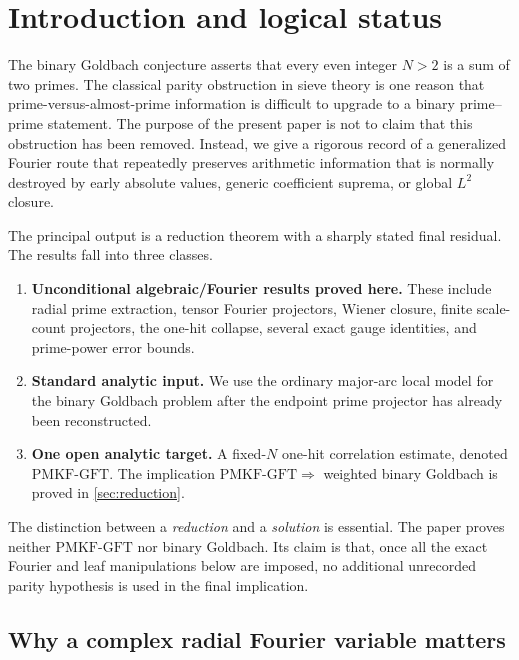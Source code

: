 \documentclass[11pt]{article}
\theoremstyle{definition}
\theoremstyle{remark}
\newcommand{\1}{\mathbf 1}
\newcommand{\PMKF}{\mathrm{PMKF}\text{-}\mathrm{GFT}}
\begin{document}
\tableofcontents

\section{Introduction and logical status}

The binary Goldbach conjecture asserts that every even integer $N>2$ is a sum of two primes.  The classical parity obstruction in sieve theory is one reason that prime-versus-almost-prime information is difficult to upgrade to a binary prime--prime statement.  The purpose of the present paper is not to claim that this obstruction has been removed.  Instead, we give a rigorous record of a generalized Fourier route that repeatedly preserves arithmetic information that is normally destroyed by early absolute values, generic coefficient suprema, or global $L^2$ closure.

The principal output is a reduction theorem with a sharply stated final residual.  The results fall into three classes.

\begin{enumerate}[label=\textbf{\arabic*.},leftmargin=2.3em]
\item \textbf{Unconditional algebraic/Fourier results proved here.}  These include radial prime extraction, tensor Fourier projectors, Wiener closure, finite scale-count projectors, the one-hit collapse, several exact gauge identities, and prime-power error bounds.
\item \textbf{Standard analytic input.}  We use the ordinary major-arc local model for the binary Goldbach problem after the endpoint prime projector has already been reconstructed.
\item \textbf{One open analytic target.}  A fixed-$N$ one-hit correlation estimate, denoted $\PMKF$.  The implication $\PMKF\Rightarrow$ weighted binary Goldbach is proved in \cref{sec:reduction}.
\end{enumerate}

The distinction between a \emph{reduction} and a \emph{solution} is essential.  The paper proves neither $\PMKF$ nor binary Goldbach.  Its claim is that, once all the exact Fourier and leaf manipulations below are imposed, no additional unrecorded parity hypothesis is used in the final implication.

\subsection{Why a complex radial Fourier variable matters}
\end{document}

